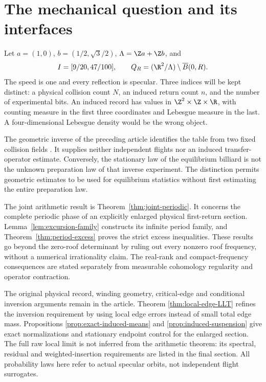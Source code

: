 \section{The mechanical question and its interfaces}
Let $a=(1,0)$, $b=(1/2,\sqrt3/2)$, $\Lambda=\Z a+\Z b$, and
\[
 I=[9/20,47/100],\qquad Q_R=(\R^2/\Lambda)\setminus\overline B(0,R).
\]
The speed is one and every reflection is specular. Three indices will be kept distinct: a physical collision count $N$, an induced return count $n$, and the number of experimental bits. An induced record has values in $\Z^2\times\Z\times\R$, with counting measure in the first three coordinates and Lebesgue measure in the last. A four-dimensional Lebesgue density would be the wrong object.

The geometric inverse of the preceding article identifies the table from two fixed collision fields \cite{A2G}. It supplies neither independent flights nor an induced transfer-operator estimate. Conversely, the stationary law of the equilibrium billiard is not the unknown preparation law of that inverse experiment. The distinction permits geometric estimates to be used for equilibrium statistics without first estimating the entire preparation law.

The joint arithmetic result is Theorem~\ref{thm:joint-periodic}. It concerns
the complete periodic phase of an explicitly enlarged physical first-return
section. Lemma~\ref{lem:excursion-family} constructs its infinite period
family, and Theorem~\ref{thm:period-excess} proves the strict excess
inequalities. These results go beyond the zero-roof determinant by ruling
out every nonzero roof frequency, without a numerical irrationality claim.
The real-rank and compact-frequency consequences are stated separately
from measurable cohomology regularity and operator contraction.

The original physical record, winding geometry, critical-edge and
conditional inversion arguments remain in the article. Theorem
\ref{thm:local-edge-LLT} refines the inversion requirement by using local
edge errors instead of small total edge mass. Propositions
\ref{prop:exact-induced-means} and \ref{prop:induced-suspension} give exact
normalizations and stationary endpoint control for the enlarged section.
The full raw local limit is not inferred from the arithmetic theorem:
its spectral, residual and weighted-insertion requirements are listed in
the final section. All probability laws here refer to actual specular
orbits, not independent flight surrogates.

